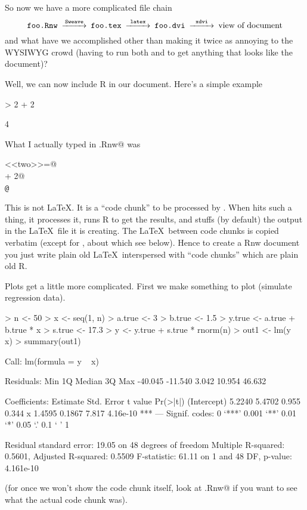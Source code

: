 \documentclass[12pt]{article}
\begin{document}
So now we have a more complicated file chain
$$
\begin{CD}
   \texttt{foo.Rnw}
   @>\texttt{Sweave}>>
   \texttt{foo.tex}
   @>\texttt{latex}>>
   \texttt{foo.dvi}
   @>\texttt{xdvi}>>
   \text{view of document}
\end{CD}
$$
and what have we accomplished other than making it twice as annoying
to the WYSIWYG crowd (having to run both \verb@Sweave@ and \verb@latex@
to get anything that looks like the document)?

Well, we can now include R in our document.  Here's a simple example
\begin{Schunk}
\begin{Sinput}
> 2 + 2
\end{Sinput}
\begin{Soutput}
[1] 4
\end{Soutput}
\end{Schunk}
What I actually typed in \verb@foo.Rnw@ was
\begin{tabbing}
\verb@<<two>>=@ \\
 + 2@ \\
\verb+@+ \\
\end{tabbing}
This is not \LaTeX.  It is a ``code chunk'' to be processed by \verb@Sweave@.
When \verb@Sweave@ hits such a thing, it processes it, runs R to get the
results, and stuffs (by default) the output in the \LaTeX\ file it is
creating.  The \LaTeX\ between code chunks is copied verbatim (except
for \verb@Sexpr@, about which see below).  Hence to create a Rnw document
you just write plain old \LaTeX\ interspersed with ``code chunks'' which
are plain old R.

\pagebreak[3]
Plots get a little more complicated.  First we make something to plot
(simulate regression data).
\begin{Schunk}
\begin{Sinput}
> n <- 50
> x <- seq(1, n)
> a.true <- 3
> b.true <- 1.5
> y.true <- a.true + b.true * x
> s.true <- 17.3
> y <- y.true + s.true * rnorm(n)
> out1 <- lm(y ~ x)
> summary(out1)
\end{Sinput}
\begin{Soutput}
Call:
lm(formula = y ~ x)

Residuals:
    Min      1Q  Median      3Q     Max 
-40.045 -11.540   3.042  10.954  46.632 

Coefficients:
            Estimate Std. Error t value Pr(>|t|)    
(Intercept)   5.2240     5.4702   0.955    0.344    
x             1.4595     0.1867   7.817 4.16e-10 ***
---
Signif. codes:  0 ‘***’ 0.001 ‘**’ 0.01 ‘*’ 0.05 ‘.’ 0.1 ‘ ’ 1 

Residual standard error: 19.05 on 48 degrees of freedom
Multiple R-squared: 0.5601,	Adjusted R-squared: 0.5509 
F-statistic: 61.11 on 1 and 48 DF,  p-value: 4.161e-10 
\end{Soutput}
\end{Schunk}
(for once we won't show the code chunk itself, look at \verb@foo.Rnw@
if you want to see what the actual code chunk was).
\end{document}
